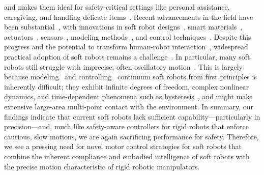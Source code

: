 and makes them ideal for safety-critical settings like personal assistance, caregiving, and handling delicate items~\citep{abidi2017intrinsic, yumbla2021human}.
Recent advancements in the field have been substantial~\citep{yasa2023overview}, with innovations in soft robot designs~\citep{laschi2012soft, hawkes2017soft, guan2023trimmed, katzschmann2018exploration, tolley2014resilient}, smart materials~\citep{terryn2017self, mazzolai2022roadmap}, actuators~\citep{shepherd2013using, vasios2020harnessing, lipton2018handedness, gravert2024low, wehner2016integrated, aubin2022towards}, sensors~\citep{larson2016highly, thuruthel2019soft, truby2020distributed}, modeling methods~\citep{renda2018discrete, boyer2020dynamics, renda2020geometric}, and control techniques~\citep{thuruthel2018model, della2020model, jitosho2023reinforcement, pustina2024input}. Despite this progress and the potential to transform human-robot interaction~\citep{jorgensen2022soft}, widespread practical adoption of soft robots remains a challenge~\citep{hawkes2021hard}. In particular, many soft robots still struggle with imprecise, often oscillatory motion~\citep{mazzolai2022roadmap, majidi2014soft, hawkes2017soft}. This is largely because modeling~\citep{armanini2023soft} and controlling~\citep{della2023model} continuum soft robots from first principles is inherently difficult; they exhibit infinite degrees of freedom, complex nonlinear dynamics, and time-dependent phenomena such as hysteresis~\citep{armanini2023soft}, and might make extensive large-area multi-point contact with the environment.
In summary, our findings indicate that current soft robots lack sufficient capability—particularly in precision—and, much like safety-aware controllers for rigid robots that enforce cautious, slow motions, we are again sacrificing performance for safety.
Therefore, we see a pressing need for novel motor control strategies for soft robots that combine the inherent compliance and embodied intelligence of soft robots with the precise motion characteristic of rigid robotic manipulators.


